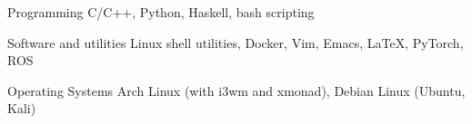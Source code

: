 \documentclass[11pt, a4paper]{cv}
\begin{document}


\begin{cvskills}

  \cvskill
    {Programming} %
    {C/C++, Python, Haskell, bash scripting} %

  \cvskill
    {Software and utilities} %
    {Linux shell utilities, Docker, Vim, Emacs, \LaTeX, PyTorch, ROS} %

  \cvskill
    {Operating Systems} %
    {Arch Linux (with i3wm and xmonad), Debian Linux (Ubuntu, Kali)} %

\end{cvskills}



%
%
%
%
%
%
%
%


\end{document}
